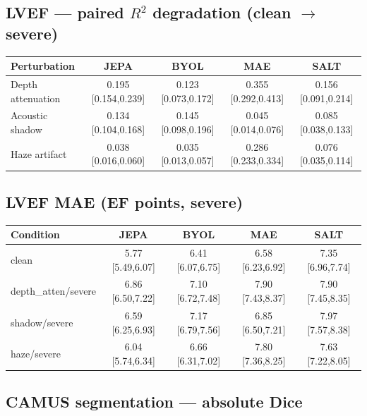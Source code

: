 \documentclass{article}
\begin{document}
\subsection{LVEF --- paired $R^2$ degradation (clean $\to$ severe)}

\begin{center}
\begin{tabular}{lcccc}
\toprule
Perturbation & JEPA & BYOL & MAE & SALT \\
\midrule
Depth attenuation & 0.195 [0.154,0.239] & 0.123 [0.073,0.172] & 0.355 [0.292,0.413] & 0.156 [0.091,0.214] \\
Acoustic shadow   & 0.134 [0.104,0.168] & 0.145 [0.098,0.196] & 0.045 [0.014,0.076] & 0.085 [0.038,0.133] \\
Haze artifact     & 0.038 [0.016,0.060] & 0.035 [0.013,0.057] & 0.286 [0.233,0.334] & 0.076 [0.035,0.114] \\
\bottomrule
\end{tabular}
\end{center}

\subsection{LVEF MAE (EF points, severe)}

\begin{center}
\begin{tabular}{lcccc}
\toprule
Condition & JEPA & BYOL & MAE & SALT \\
\midrule
clean              & 5.77 [5.49,6.07] & 6.41 [6.07,6.75] & 6.58 [6.23,6.92] & 7.35 [6.96,7.74] \\
depth\_atten/severe & 6.86 [6.50,7.22] & 7.10 [6.72,7.48] & 7.90 [7.43,8.37] & 7.90 [7.45,8.35] \\
shadow/severe      & 6.59 [6.25,6.93] & 7.17 [6.79,7.56] & 6.85 [6.50,7.21] & 7.97 [7.57,8.38] \\
haze/severe        & 6.04 [5.74,6.34] & 6.66 [6.31,7.02] & 7.80 [7.36,8.25] & 7.63 [7.22,8.05] \\
\bottomrule
\end{tabular}
\end{center}

\subsection{CAMUS segmentation --- absolute Dice}
\end{document}
